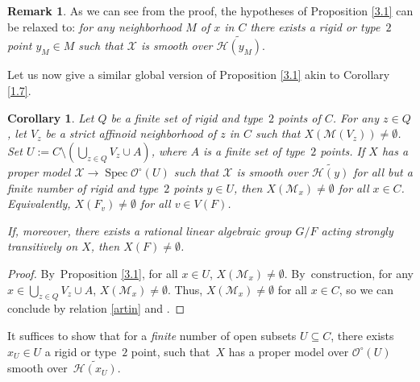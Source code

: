 \documentclass[10pt]{amsart}
\DeclareMathOperator{\Spec}{Spec}
\let\backslash\setminus
\newtheorem{cor}[thm]{Corollary}
\theoremstyle{definition}
\newtheorem{rem}[thm]{Remark}
\begin{document}
\begin{rem} \label{3.2}
As we can see from the proof, the hypotheses of Proposition \ref{3.1} can be relaxed to: \emph{for any neighborhood $M$ of $x$ in $C$ there exists a rigid or type~$2$ point $y_M \in M$ such that $\mathcal{X}$ is smooth over $\widetilde{\mathcal{H}(y_M)}$}.
\end{rem}

Let us now give a similar global version of Proposition \ref{3.1} akin to Corollary \ref{1.7}.

\begin{cor} \label{3.3}
Let $Q$ be a finite set of rigid and type~$2$ points of $C$. For any $z \in Q$, let $V_z$ be a strict affinoid neighborhood of $z$ in $C$ such that $X(\mathscr{M}(V_z)) \neq \emptyset$. Set $U:=C \backslash (\bigcup_{z \in Q} V_z \cup A)$, where $A$ is a finite set of type~$2$ points. If $X$ has a proper model $\mathcal{X} \to \Spec \mathcal{O}^{\circ}(U)$ such that $\mathcal{X}$ is smooth over $\widetilde{\mathcal{H}(y)}$ for all but a finite number of \emph{rigid} and \emph{type~$2$} points $y \in U$,
then $X(\mathscr{M}_x) \neq \emptyset$ for all $x \in C$. Equivalently, $X(F_v) \neq \emptyset$ for all $v \in V(F)$.

If, moreover, there exists a rational linear algebraic group $G/F$ acting strongly transitively on $X$, then $X(F) \neq \emptyset$.
\end{cor}

\begin{proof}
By~Proposition \ref{3.1}, for all ${x \in U}$, ${X(\mathscr{M}_x) \neq \emptyset}$. By~construction, for any $x \in \bigcup_{z \in Q} V_z \cup A$, ${X(\mathscr{M}_x) \neq \emptyset}$. Thus, $X(\mathscr{M}_x) \neq \emptyset$ for all $x \in C$, so we can conclude by relation \eqref{artin} and \cite[Cor.\,3.18]{une}.
\end{proof}

It suffices to show that for a \emph{finite} number of open subsets $U \subseteq C$, there exists $x_U \in U$ a rigid or type~$2$ point, such that~$X$ has a proper model over $\mathcal{O}^{\circ}(U)$ smooth over~$\widetilde{\mathcal{H}(x_U)}$.
\end{document}
